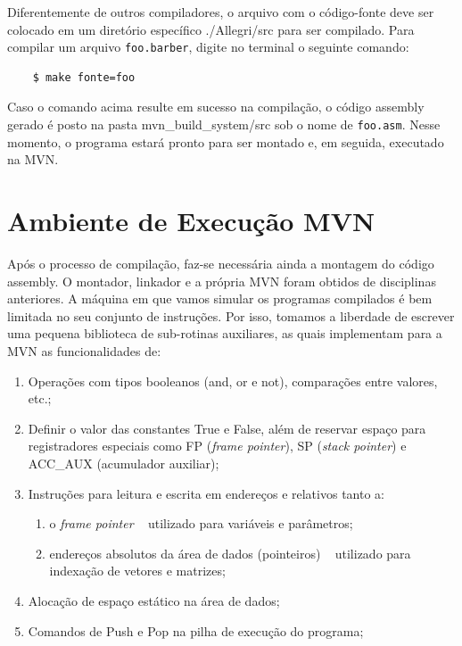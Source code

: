 \documentclass[a4paper,12pt]{report}
\begin{document}
    Diferentemente de outros compiladores, o arquivo com o código-fonte deve ser colocado em um diretório específico \textemdash \space ./Allegri/src \textemdash \space para ser compilado. Para compilar um arquivo \verb|foo.barber|, digite no terminal o seguinte comando:

    \begin{verbatim}
    $ make fonte=foo \end{verbatim}

    Caso o comando acima resulte em sucesso na compilação, o código assembly gerado é posto na pasta mvn\_build\_system/src sob o nome de \verb|foo.asm|. Nesse momento, o programa estará pronto para ser montado e, em seguida, executado na MVN.

    \section*{Ambiente de Execução MVN}
    Após o processo de compilação, faz-se necessária ainda a montagem do código assembly. O montador, linkador e a própria MVN foram obtidos de disciplinas anteriores.
    A máquina em que vamos simular os programas compilados é bem limitada no seu conjunto de instruções. Por isso, tomamos a liberdade de escrever uma pequena biblioteca de sub-rotinas auxiliares, as quais implementam para a MVN as funcionalidades de:
    
    \begin{enumerate}
        \item Operações com tipos booleanos (and, or e not), comparações entre valores, etc.;
        \item Definir o valor das constantes True e False, além de reservar espaço para registradores especiais como FP (\textit{frame pointer}), SP (\textit{stack pointer}) e ACC\_AUX (acumulador auxiliar);
        \item Instruções para leitura e escrita em endereços e relativos tanto a:
            \begin{enumerate}
                \item o \textit{frame pointer} \textemdash~ utilizado para variáveis e parâmetros;
                \item endereços absolutos da área de dados (pointeiros) \textemdash~ utilizado para indexação de vetores e matrizes;
            \end{enumerate}
        \item Alocação de espaço estático na área de dados;
        \item Comandos de Push e Pop na pilha de execução do programa;
    \end{enumerate}
\end{document}
